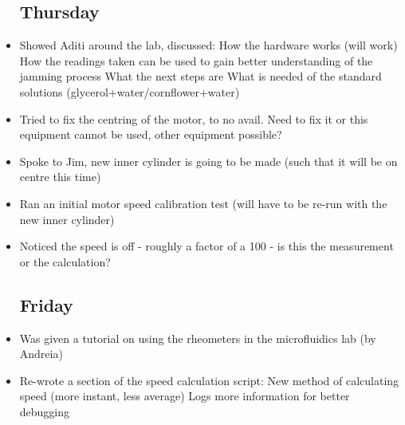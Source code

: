 \documentclass[a4]{report}
\begin{document}
\begin{itemize}
		\subsection*{Thursday}
		\item Showed Aditi around the lab, discussed:
		\subitem How the hardware works (will work)
		\subitem How the readings taken can be used to gain better understanding of the jamming process
		\subitem What the next steps are
		\subitem What is needed of the standard solutions (glycerol+water/cornflower+water)
		\item Tried to fix the centring of the motor, to no avail. Need to fix it or this equipment cannot be used, other equipment possible?
		\item Spoke to Jim, new inner cylinder is going to be made (such that it will be on centre this time)
		\item Ran an initial motor speed calibration test (will have to be re-run with the new inner cylinder)
		\item Noticed the speed is off - roughly a factor of a 100 - is this the measurement or the calculation?
		\subsection*{Friday}
		\item Was given a tutorial on using the rheometers in the microfluidics lab (by Andreia)
		\item Re-wrote a section of the speed calculation script:
		\subitem New method of calculating speed (more instant, less average)
		\subitem Logs more information for better debugging
	\end{itemize}
	\newpage
\end{document}
